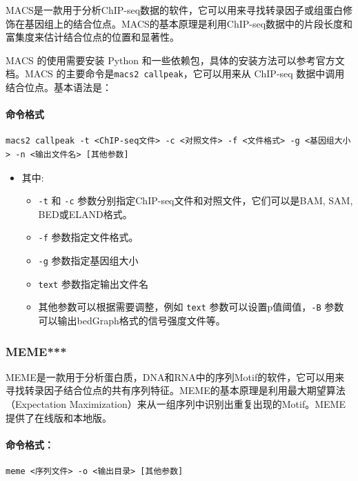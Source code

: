 \documentclass[UTF8]{ctexart}
\begin{document}
MACS是一款用于分析ChIP-seq数据的软件，它可以用来寻找转录因子或组蛋白修饰在基因组上的结合位点。MACS的基本原理是利用ChIP-seq数据中的片段长度和富集度来估计结合位点的位置和显著性。

MACS 的使用需要安装 Python 和一些依赖包，具体的安装方法可以参考官方文档。MACS 的主要命令是\verb|macs2 callpeak|，它可以用来从 ChIP-seq 数据中调用结合位点。基本语法是：

\paragraph*{命令格式}

\begin{lstlisting}
macs2 callpeak -t <ChIP-seq文件> -c <对照文件> -f <文件格式> -g <基因组大小> -n <输出文件名> [其他参数]
\end{lstlisting}

\begin{itemize}
	\item 其中:
	\begin{itemize}
		\item \verb|-t| 和 \verb|-c| 参数分别指定ChIP-seq文件和对照文件，它们可以是BAM, SAM, BED或ELAND格式。
		\item \verb|-f| 参数指定文件格式。
		\item \verb|-g| 参数指定基因组大小
		\item \verb|text| 参数指定输出文件名
		\item 其他参数可以根据需要调整，例如 \verb|text| 参数可以设置p值阈值，\verb|-B| 参数可以输出bedGraph格式的信号强度文件等。
	\end{itemize}
\end{itemize}

\subsubsection{MEME***}

MEME是一款用于分析蛋白质，DNA和RNA中的序列Motif的软件，它可以用来寻找转录因子结合位点的共有序列特征。MEME的基本原理是利用最大期望算法（Expectation Maximization）来从一组序列中识别出重复出现的Motif。MEME提供了在线版和本地版。

\paragraph*{命令格式：}
\begin{lstlisting}
meme <序列文件> -o <输出目录> [其他参数]	
\end{lstlisting}
\end{document}
